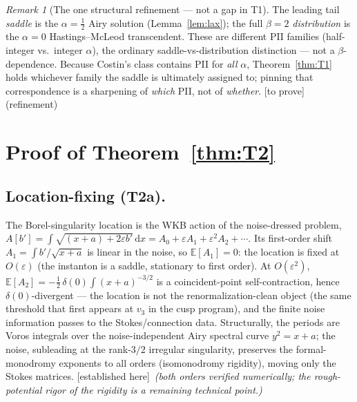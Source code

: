 \documentclass[11pt,reqno]{amsart}
\theoremstyle{plain}
\theoremstyle{definition}
\theoremstyle{remark}
\newtheorem{remark}[theorem]{Remark}
\newcommand{\dd}{\,\mathrm{d}}
\newcommand{\E}{\mathbb{E}}
\newcommand{\eps}{\varepsilon}
\newcommand{\tagPr}{{\footnotesize\textsf{[established here]}}}
\newcommand{\tagT}{{\footnotesize\textsf{[to prove]}}}
\begin{document}
\begin{remark}[The one structural refinement --- not a gap in T1]\label{rem:family}
The leading tail \emph{saddle} is the $\alpha=\tfrac12$ Airy solution (Lemma~\ref{lem:lax}); the
full $\beta=2$ \emph{distribution} is the $\alpha=0$ Hastings--McLeod transcendent. These are
different PII families (half-integer vs.\ integer $\alpha$), the ordinary saddle-vs-distribution
distinction --- not a $\beta$-dependence. Because Costin's class contains PII for \emph{all}
$\alpha$, Theorem~\ref{thm:T1} holds whichever family the saddle is ultimately assigned to; pinning
that correspondence is a sharpening of \emph{which} PII, not of \emph{whether}. \tagT\,(refinement)
\end{remark}

\section{Proof of Theorem~\ref{thm:T2}}\label{sec:T2proof}

\subsection{Location-fixing (T2a).}
The Borel-singularity location is the WKB action of the noise-dressed problem,
$A[b']=\int\sqrt{(x+a)+2\eps b'}\dd x=A_0+\eps A_1+\eps^2 A_2+\cdots$. Its first-order shift
$A_1=\int b'/\sqrt{x+a}$ is linear in the noise, so $\E[A_1]=0$: the location is fixed at $O(\eps)$
(the instanton is a saddle, stationary to first order). At $O(\eps^2)$,
$\E[A_2]=-\tfrac12\,\delta(0)\!\int(x+a)^{-3/2}$ is a coincident-point self-contraction, hence
$\delta(0)$-divergent --- the location is not the renormalization-clean object (the same threshold
that first appears at $v_3$ in the cusp program), and the finite noise information passes to the
Stokes/connection data. Structurally, the periods are Voros integrals over the noise-independent
Airy spectral curve $y^2=x+a$; the noise, subleading at the rank-$3/2$ irregular singularity,
preserves the formal-monodromy exponents to all orders (isomonodromy rigidity), moving only the
Stokes matrices. \tagPr\ \emph{(both orders verified numerically; the rough-potential rigor of the
rigidity is a remaining technical point.)}
\end{document}
